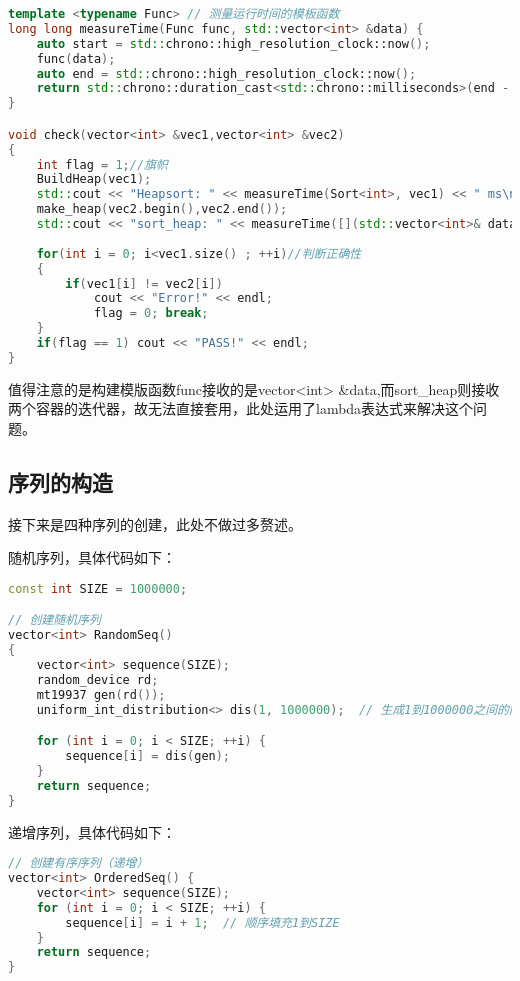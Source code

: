 \documentclass[fontset=fandol]{ctexart}
\begin{document}
\begin{lstlisting}[language=C++, caption={check()函数&measuretime模版函数}]
template <typename Func> // 测量运行时间的模板函数
long long measureTime(Func func, std::vector<int> &data) {
    auto start = std::chrono::high_resolution_clock::now();
    func(data);
    auto end = std::chrono::high_resolution_clock::now();
    return std::chrono::duration_cast<std::chrono::milliseconds>(end - start).count();
}

void check(vector<int> &vec1,vector<int> &vec2)
{
    int flag = 1;//旗帜
    BuildHeap(vec1);
    std::cout << "Heapsort: " << measureTime(Sort<int>, vec1) << " ms\n";
    make_heap(vec2.begin(),vec2.end());
    std::cout << "sort_heap: " << measureTime([](std::vector<int>& data) {std::sort_heap(data.begin(), data.end());}, vec2) << " ms\n";
    
    for(int i = 0; i<vec1.size() ; ++i)//判断正确性
    {
        if(vec1[i] != vec2[i]) 
            cout << "Error!" << endl;
            flag = 0; break;
    } 
    if(flag == 1) cout << "PASS!" << endl;
}
\end{lstlisting}

值得注意的是构建模版函数func接收的是vector<int> \&data,而sort\_heap则接收两个容器的迭代器，故无法直接套用，此处运用了lambda表达式来解决这个问题。

\subsection{序列的构造}
接下来是四种序列的创建，此处不做过多赘述。

随机序列，具体代码如下：
\begin{lstlisting}[language=C++, caption={RandomSeq()函数}]  
const int SIZE = 1000000;

// 创建随机序列
vector<int> RandomSeq() 
{
    vector<int> sequence(SIZE);
    random_device rd;
    mt19937 gen(rd());
    uniform_int_distribution<> dis(1, 1000000);  // 生成1到1000000之间的随机数

    for (int i = 0; i < SIZE; ++i) {
        sequence[i] = dis(gen);
    }
    return sequence;
}
\end{lstlisting}

递增序列，具体代码如下：
\begin{lstlisting}[language=C++, caption={OrderedSeq()函数}]  
// 创建有序序列（递增）
vector<int> OrderedSeq() {
    vector<int> sequence(SIZE);
    for (int i = 0; i < SIZE; ++i) {
        sequence[i] = i + 1;  // 顺序填充1到SIZE
    }
    return sequence;
}
\end{lstlisting}
\end{document}
